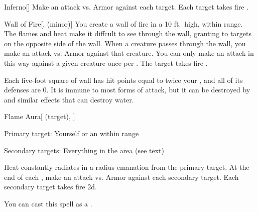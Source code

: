 \lowercase{\hypertarget{spell:Inferno}{}}\label{spell:Inferno}
\begin{freeability}[Rank 4]{\hypertarget{spell:Inferno}{Inferno}}[]
Make an attack vs. Armor against each target.
\hit Each target takes fire .
\end{freeability}
\vspace{0.25em}



\lowercase{\hypertarget{spell:Wall of Fire}{}}\label{spell:Wall of Fire}
\begin{freeability}[Rank 4]{\hypertarget{spell:Wall of Fire}{Wall of Fire}}[,  (minor)]
You create a wall of fire in a 10 ft.\ high, \arealarge {} within \rngmed range.
The flames and heat make it diffcult to see through the wall, granting  to targets on the opposite side of the wall.
When a creature passes through the wall, you make an attack vs. Armor against that creature.
You can only make an attack in this way against a given creature once per .
\hit The target takes fire .

Each five-foot square of wall has hit points equal to twice your , and all of its defenses are 0.
It is immune to most forms of attack, but it can be destroyed by  and similar effects that can destroy water.
\end{freeability}
\vspace{0.25em}



\lowercase{\hypertarget{spell:Flame Aura}{}}\label{spell:Flame Aura}
\begin{attuneability}[Rank 5]{\hypertarget{spell:Flame Aura}{Flame Aura}}[ (target), ]

Primary target: Yourself or an  within \rngclose range
\par\noindent
Secondary targets: Everything in the area (see text)

Heat constantly radiates in a \areasmall radius emanation from the primary target.
At the end of each , make an attack vs. Armor against each secondary target.
\hit Each secondary target takes fire  \minus2d.

You can cast this spell as a .
\end{attuneability}
\vspace{0.25em}



